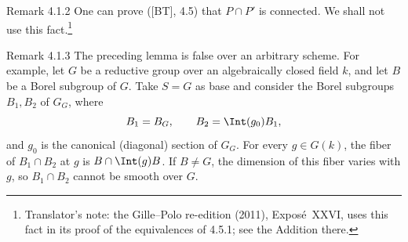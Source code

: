 \begin{sgastatement}{Remark 4.1.2}
One can prove \textup{([BT], 4.5)} that \(P\cap P'\) is connected.  We
shall not use this fact.\footnote{Translator's note: the Gille--Polo re-edition (2011), Exposé~XXVI, uses
this fact in its proof of the equivalences of 4.5.1; see the Addition there.}
\end{sgastatement}

\begin{sgastatement}{Remark 4.1.3}
The preceding lemma is false over an arbitrary scheme.  For example, let
\(G\) be a reductive group over an algebraically closed field \(k\), and
let \(B\) be a Borel subgroup of \(G\).  Take \(S=G\) as base and
consider the Borel subgroups \(B_1,B_2\) of \(G_G\), where
\[
 B_1=B_G,\qquad B_2=\Int(g_0)B_1,
\]
and \(g_0\) is the canonical (diagonal) section of \(G_G\).  For every
\(g\in G(k)\), the fiber of \(B_1\cap B_2\) at \(g\) is
\(B\cap\Int(g)B\).  If \(B\ne G\), the dimension of this fiber varies
with \(g\), so \(B_1\cap B_2\) cannot be smooth over \(G\).
\end{sgastatement}


